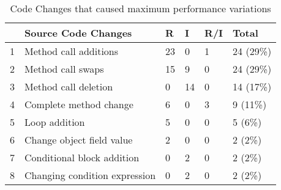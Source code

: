 \documentclass[article,type=msc,colorback,12pt,accentcolor=tud8b,table]{tudthesis}
\begin{document}
\begin{enumerate}
\begin{table}[]
	\centering
	\caption{Code Changes that caused maximum performance variations \cite{sandoval2016learning}}
	\label{tab:Table2}
	\begin{tabular}{|l|l|l|l|l|l|}
		\hline
		& \cellcolor[HTML]{FFD27F}\textbf{Source Code Changes} & \cellcolor[HTML]{FFD27F}\textbf{R} & \cellcolor[HTML]{FFD27F}\textbf{I} & \cellcolor[HTML]{FFD27F}\textbf{R/I} & \cellcolor[HTML]{FFD27F}\textbf{Total} \\ \hline
		1  & Method call additions                                & 23                                 & 0                                  & 1                                    & 24 (29\%)                              \\ \hline
		2  & Method call swaps                                    & 15                                 & 9                                  & 0                                    & 24 (29\%)                              \\ \hline
		3  & Method call deletion                                 & 0                                  & 14                                 & 0                                    & 14 (17\%)                              \\ \hline
		4  & Complete method change                               & 6                                  & 0                                  & 3                                    & 9 (11\%)                               \\ \hline
		5  & Loop addition                                        & 5                                  & 0                                  & 0                                    & 5 (6\%)                                \\ \hline
		6  & Change object field value                            & 2                                  & 0                                  & 0                                    & 2 (2\%)                                \\ \hline
		7  & Conditional block addition                           & 0                                  & 2                                  & 0                                    & 2 (2\%)                                \\ \hline
		8  & Changing condition expression                        & 0                                  & 2                                  & 0                                    & 2 (2\%)                                \\ \hline

\end{tabular}
\end{table}
\end{enumerate}
\end{document}
